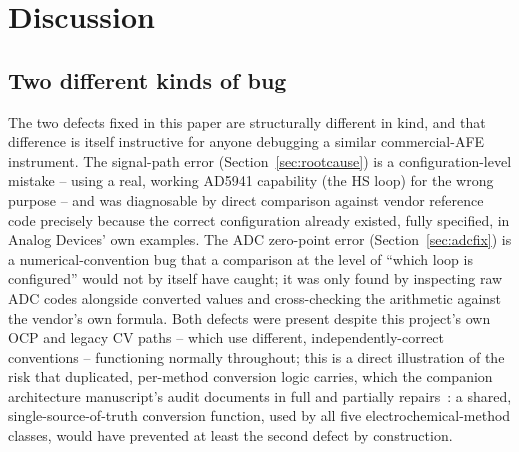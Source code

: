 \section{Discussion}
\label{sec:discussion}

\subsection{Two different kinds of bug}
The two defects fixed in this paper are structurally different in kind,
and that difference is itself instructive for anyone debugging a similar
commercial-AFE instrument. The signal-path error (Section~\ref{sec:rootcause})
is a configuration-level mistake -- using a real, working AD5941 capability
(the HS loop) for the wrong purpose -- and was diagnosable by direct
comparison against vendor reference code precisely because the correct
configuration already existed, fully specified, in Analog Devices' own
examples. The ADC zero-point error (Section~\ref{sec:adcfix}) is a
numerical-convention bug that a comparison at the level of ``which loop is
configured'' would not by itself have caught; it was only found by
inspecting raw ADC codes alongside converted values and cross-checking the
arithmetic against the vendor's own formula. Both defects were present
despite this project's own OCP and legacy CV paths -- which use different,
independently-correct conventions -- functioning normally throughout; this
is a direct illustration of the risk that duplicated, per-method
conversion logic carries, which the companion architecture manuscript's
audit documents in full and partially
repairs~\cite{clement2026architecture}: a shared, single-source-of-truth
conversion function, used by all five electrochemical-method classes,
would have prevented at least the second defect by construction.

